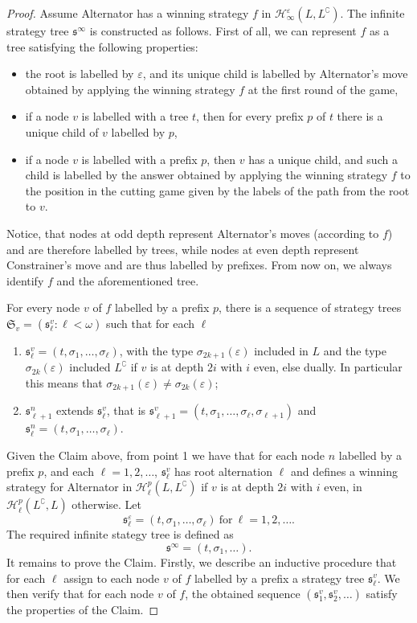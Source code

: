  \begin{proof} 
 Assume Alternator has a winning strategy $f$ in  $\mathcal{H}^\varepsilon_\infty(L, L^\complement)$. The infinite strategy tree $\mathfrak{s}^\infty$ is constructed as follows. First of all, we can represent $f$ as a tree satisfying the following properties:
\begin{itemize}
\item the root is labelled by $\varepsilon$, and its unique child is labelled by Alternator's move obtained by applying the winning strategy $f$ at the first round of the game,
\item if a node $v$ is labelled with a tree $t$, then for every prefix $p$ of $t$ there is a unique child of $v$ labelled by $p$,
\item if a node $v$ is labelled with a prefix $p$, then $v$ has a unique child, and such a child is labelled by the answer obtained by applying the winning strategy $f$ to the position in the cutting game given by the labels of the path from the root to $v$.
\end{itemize}
Notice, that nodes at odd depth represent Alternator's moves (according to $f$) and are therefore labelled by trees, while nodes at even depth represent Constrainer's move and are thus labelled by prefixes. From now on, we always identify $f$ and the aforementioned tree.
\begin{claim}\label{claim:strategy}
For every node $v$ of $f$ labelled by a prefix $p$, 
there is a sequence of strategy trees $\mathfrak{S}_v=(\mathfrak{s}^v_\ell: \ell < \omega)$ such that for each $\ell$
\begin{enumerate}
\item $\mathfrak{s}^v_\ell=(t, \sigma_1, \dots, \sigma_\ell)$, with the type $\sigma_{2k+1}(\varepsilon)$ included in $L$ and the type  $\sigma_{2k}(\varepsilon)$ included  $L^\complement$ if $v$ is at depth $2i$ with $i$ even, else dually. In particular this means that  $\sigma_{2k+1}(\varepsilon) \neq \sigma_{2k}(\varepsilon)$;
\item $\mathfrak{s}^n_{\ell+1}$ extends $\mathfrak{s}^v_\ell$, that is  $\mathfrak{s}^v_{\ell+1}=(t, \sigma_1, \dots, \sigma_\ell, \sigma_{\ell+1})$ and $\mathfrak{s}^n_\ell=(t, \sigma_1, \dots, \sigma_\ell)$.
\end{enumerate}
\end{claim}
Given the Claim above, from point 1 we have that
for each node $n$ labelled by a prefix $p$, and each $\ell=1,2,\dots$, $\mathfrak{s}^v_\ell$ has root alternation $\ell$ and defines a winning strategy for Alternator in $\mathcal{H}^p_\ell(L, L^\complement)$ if $v$ is at depth $2i$ with $i$ even, in $\mathcal{H}^p_\ell(L^\complement, L)$ otherwise. 
Let \[ \mathfrak{s}^\varepsilon_\ell = (t, \sigma_1, \dots, \sigma_\ell)\ \mbox{for}\ \ell=1,2,\dots.\] The required   
infinite stategy tree is defined as 
\[ \mathfrak{s}^\infty = (t, \sigma_1, \dots ). \]
It remains to prove the Claim.
Firstly, we describe an inductive procedure that for each $\ell$ assign to each node $v$ of $f$ labelled by a prefix a strategy tree $\mathfrak{s}^v_\ell$.
We then verify that for each node $v$ of $f$, the obtained sequence $(\mathfrak{s}^v_1, \mathfrak{s}^v_2, \dots)$ satisfy
the properties of the Claim. 


\end{proof}
